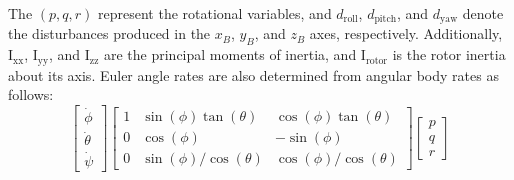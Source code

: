\documentclass[3p,times]{elsarticle}
\begin{document}
\noindent The $(p, q, r)$ represent the rotational variables, and $d_{\text{roll}}$, $d_{\text{pitch}}$, and $d_{\text{yaw}}$ denote the disturbances produced in the $x_B$, $y_B$, and $z_B$ axes, respectively. Additionally, $\mathrm{I}_{\text{xx}}$, $\mathrm{I}_{\text{yy}}$, and $\mathrm{I}_{\text{zz}}$ are the principal moments of inertia, and $\mathrm{I}_{\text{rotor}}$ is the rotor inertia about its axis. Euler angle rates are also determined from angular body rates as follows:
\begin{equation}
	\begin{bmatrix}
	\dot\phi \\
	\dot\theta \\
	\dot\psi
	\end{bmatrix}
	\begin{bmatrix}
	1 & \sin(\phi)\tan(\theta) & \cos(\phi)\tan(\theta) \\
	0 & \cos(\phi) & -\sin(\phi) \\
	0 & \sin(\phi)/\cos(\theta) & \cos(\phi)/\cos(\theta)
	\end{bmatrix}
	\begin{bmatrix}
	p \\
	q \\
	r
	\end{bmatrix}
	\end{equation}
\end{document}
